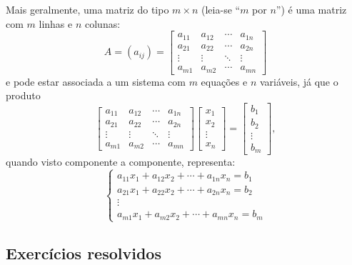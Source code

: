 Mais geralmente, uma matriz do tipo $m\times n$ (leia-se ``$m$ por $n$'') é uma matriz com $m$ linhas e $n$ colunas:
\begin{equation}
A = \left(a_{ij}\right) =
\begin{bmatrix}
a_{11}&a_{12}&\cdots &a_{1n}\\
a_{21}&a_{22}&\cdots &a_{2n}\\
\vdots &\vdots &\ddots &\vdots \\
a_{m1}&a_{m2}&\cdots &a_{mn}
\end{bmatrix}
\end{equation} e pode estar associada a um sistema com $m$ equações e $n$ variáveis, já que o produto
\begin{equation}
\left[
  \begin{array}{cccc}
  a_{11}&a_{12}&\cdots &a_{1n}\\
  a_{21}&a_{22}&\cdots &a_{2n}\\
  \vdots &\vdots &\ddots &\vdots \\
  a_{m1}&a_{m2}&\cdots &a_{mn}
\end{array}
\right]
\left[
  \begin{array}{c}
    x_1 \\
    x_2 \\
    \vdots \\
    x_n
  \end{array}
\right] =
\left[
  \begin{array}{c}
    b_1 \\
    b_2 \\
    \vdots \\
    b_m
  \end{array}
\right],
\end{equation} quando visto componente a componente, representa:
\begin{equation}
\left\{
  \begin{array}{cc}
  a_{11} x_1 + a_{12} x_2 + \cdots + a_{1n} x_n =  b_1 \\
  a_{21} x_1 + a_{22} x_2 + \cdots + a_{2n} x_n =  b_2 \\
    \vdots \\
  a_{m1} x_1 + a_{m2} x_2 + \cdots + a_{mn} x_n =  b_m 
\end{array}
\right.
\end{equation}


\subsection*{Exercícios resolvidos}



